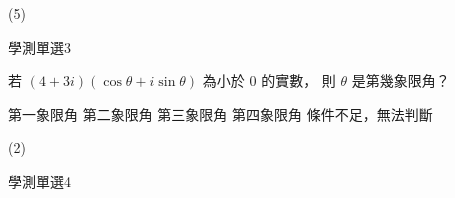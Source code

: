 \begin{QUESTIONS}
\begin{QUESTION}
\begin{QFROMS}
        \end{QFROMS}
        \begin{QTAGS}\end{QTAGS}
        \begin{QANS}
            (5)
        \end{QANS}
        \begin{QSOLLIST}
        \end{QSOLLIST}
        \begin{QEMPTYSPACE}
        \end{QEMPTYSPACE}
    \end{QUESTION}
    \begin{QUESTION}
        \begin{ExamInfo}{92}{學測}{單選}{3}
        \end{ExamInfo}
        \begin{ExamAnsRateInfo}{41}{66}{36}{21}
        \end{ExamAnsRateInfo}
        \begin{QBODY}
            若 $(4 + 3i)(\cos \theta + i \sin \theta )$ 為小於 0 的實數， 則 $\theta$ 是第幾象限角？ 
            \begin{QOPS} 
                \QOP 第一象限角 
                \QOP 第二象限角 
                \QOP 第三象限角 
                \QOP 第四象限角 
                \QOP 條件不足，無法判斷
            \end{QOPS}
        \end{QBODY}
        \begin{QFROMS}
        \end{QFROMS}
        \begin{QTAGS}\end{QTAGS}
        \begin{QANS}
            (2)
        \end{QANS}
        \begin{QSOLLIST}
        \end{QSOLLIST}
        \begin{QEMPTYSPACE}
        \end{QEMPTYSPACE}
    \end{QUESTION}
    \begin{QUESTION}
        \begin{ExamInfo}{92}{學測}{單選}{4}
        \end{ExamInfo}
        \begin{ExamAnsRateInfo}{49}{69}{47}{31}

\end{ExamAnsRateInfo}
\end{QUESTION}
\end{QUESTIONS}
